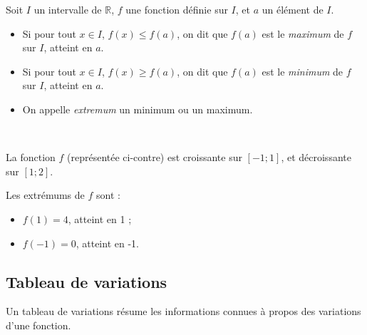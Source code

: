 \begin{definition}
  Soit $I$ un intervalle de $\mathbb R$, $f$ une fonction définie sur $I$, et
  $a$ un élément de $I$.
  \begin{itemize}
    \item Si pour tout $x\in I$, $f(x)\leq f(a)$, on dit que $f(a)$ est le
      \emph{maximum} de $f$ sur $I$, atteint en $a$.
    \item Si pour tout $x\in I$, $f(x)\geq f(a)$, on dit que $f(a)$ est le
      \emph{minimum} de $f$ sur $I$, atteint en $a$.
    \item On appelle \emph{extremum} un minimum ou un maximum.
  \end{itemize}
\end{definition}

\begin{exemple}~
  \begin{multicols}{2}

    La fonction $f$ (représentée ci-contre) est croissante sur $[-1;1]$, et décroissante sur $[1;2]$.

    Les extrémums de $f$ sont :
    \begin{itemize}
      \item $f(1)=4$, atteint en 1 ;
      \item $f(-1)=0$, atteint en -1.
    \end{itemize}

  \end{multicols}
\end{exemple}

\subsection{Tableau de variations}

\begin{definition}
  Un tableau de variations résume les informations connues à propos des variations d'une fonction.
\end{definition}
